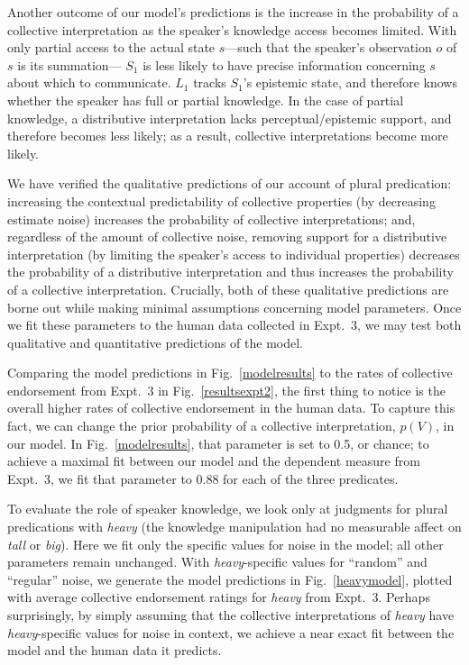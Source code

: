 \documentclass[linguex]{sp}
\begin{document}
Another outcome of our model's predictions is the increase in the probability of a collective interpretation as the speaker's knowledge access becomes limited. With only partial access to the actual state $s$---such that the speaker's observation $o$ of $s$ is its summation--- $S_{1}$ is less likely to have precise information concerning $s$ about which to communicate. $L_{1}$ tracks  $S_{1}$'s epistemic state, and therefore knows whether the speaker has full or partial knowledge. In the case of partial knowledge, a distributive interpretation lacks perceptual/epistemic support, and therefore becomes less likely; as a result, collective interpretations become more likely.

We have verified the qualitative predictions of our account of plural predication: increasing the contextual predictability of collective properties (by decreasing estimate noise) increases the probability of collective interpretations; and, regardless of the amount of collective noise, removing support for a distributive interpretation (by limiting the speaker's access to individual properties) decreases the probability of a distributive interpretation and thus increases the probability of a collective interpretation. Crucially, both of these qualitative predictions are borne out while making minimal assumptions concerning model parameters. Once we fit these parameters to the human data collected in Expt.~3, we may test both qualitative and quantitative predictions of the model.

Comparing the model predictions in Fig.~\ref{modelresults} to the rates of collective endorsement from Expt.~3 in Fig.~\ref{resultsexpt2}, the first thing to notice is the overall higher rates of collective endorsement in the human data. To capture this fact, we can change the prior probability of a collective interpretation, $p(V)$, in our model. In Fig.~\ref{modelresults}, that parameter is set to 0.5, or chance; to achieve a maximal fit between our model and the dependent measure from Expt.~3, we fit that parameter to 0.88 for each of the three predicates.

To evaluate the role of speaker knowledge, we look only at judgments for plural predications with \emph{heavy} (the knowledge manipulation had no measurable affect on \emph{tall} or \emph{big}). Here we fit only the specific values for noise in the model; all other parameters remain unchanged. With \emph{heavy}-specific values for ``random'' and ``regular'' noise, we generate the model predictions in Fig.~\ref{heavymodel}, plotted with average collective endorsement ratings for \emph{heavy} from Expt.~3. Perhaps surprisingly, by simply assuming that the collective interpretations of \emph{heavy} have \emph{heavy}-specific values for noise in context, we achieve a near exact fit between the model and the human data it predicts.
\end{document}
